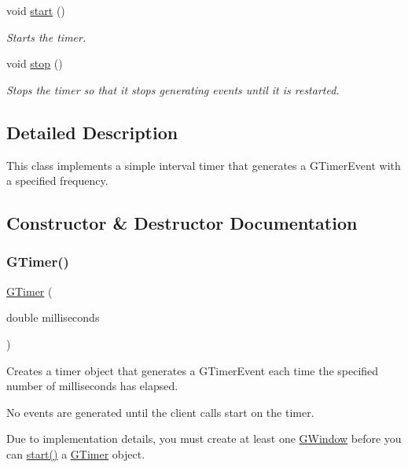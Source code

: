 \begin{DoxyCompactItemize}
void \mbox{\hyperlink{classGTimer_a60de64d75454385b23995437f1d72669}{start}} ()
\begin{DoxyCompactList}\small\item\em Starts the timer. \end{DoxyCompactList}\item 
void \mbox{\hyperlink{classGTimer_a8c528baf37154d347366083f0f816846}{stop}} ()
\begin{DoxyCompactList}\small\item\em Stops the timer so that it stops generating events until it is restarted. \end{DoxyCompactList}\end{DoxyCompactItemize}


\subsection{Detailed Description}
This class implements a simple interval timer that generates a {\ttfamily G\+Timer\+Event} with a specified frequency. 

\subsection{Constructor \& Destructor Documentation}
\mbox{\label{classGTimer_ab947e096ce76b63f283502e4b4446810}} 
\subsubsection{\texorpdfstring{G\+Timer()}{GTimer()}}
{\footnotesize\ttfamily \mbox{\hyperlink{classGTimer}{G\+Timer}} (\begin{DoxyParamCaption}\item[{double}]{milliseconds }\end{DoxyParamCaption})}



Creates a timer object that generates a {\ttfamily G\+Timer\+Event} each time the specified number of milliseconds has elapsed. 

No events are generated until the client calls {\ttfamily start} on the timer.

Due to implementation details, you must create at least one \mbox{\hyperlink{classGWindow}{G\+Window}} before you can \mbox{\hyperlink{classGTimer_a60de64d75454385b23995437f1d72669}{start()}} a \mbox{\hyperlink{classGTimer}{G\+Timer}} object.



